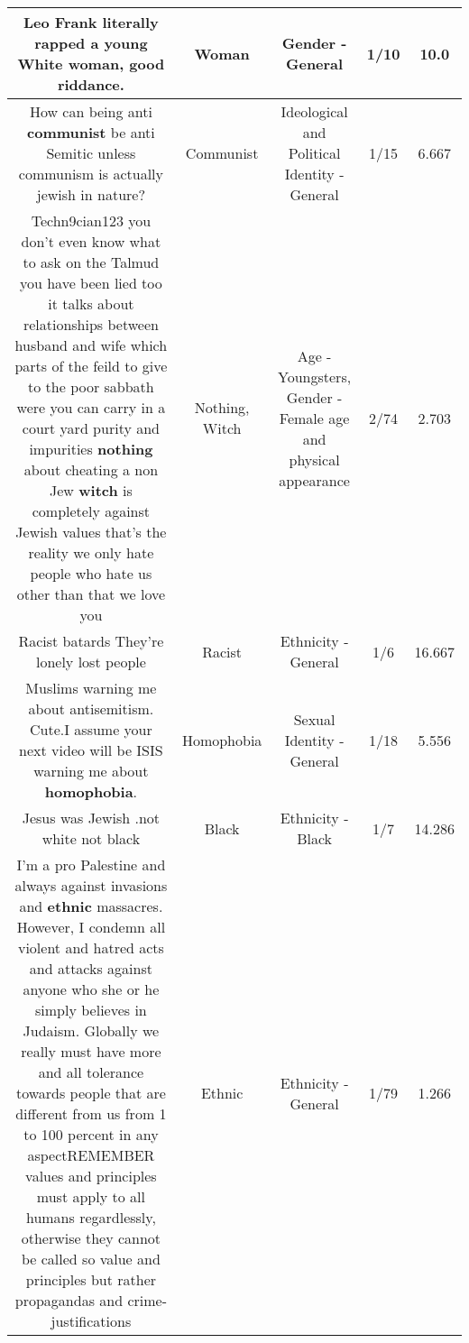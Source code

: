 \documentclass[11pt]{article}
\newlength\mylength
\begin{document}
\begin{center}
\begin{longtable}{|C{.65\mylength}|C{.30\mylength}|C{.12\mylength}|C{.12\mylength}|C{.12\mylength}|}
  \small Leo Frank literally rapped a young White \textbf{woman}, good riddance.\normalsize   & Woman & Gender - General & 1/10 & 10.0 \\  \hline
  \small How can being anti \textbf{communist} be anti Semitic unless communism is actually jewish in nature?\normalsize   & Communist &  Ideological and Political Identity - General & 1/15 & 6.667 \\  \hline
  \small Techn9cian123 you don't even know what to ask on the Talmud you have been lied too it talks about relationships between husband and wife which parts of the feild to give to the poor sabbath were you can carry in a court yard purity and impurities \textbf{nothing} about cheating a non Jew \textbf{witch} is completely against Jewish values that's the reality we only hate people who hate us other than that we love you\normalsize   & Nothing, Witch & Age - Youngsters, Gender - Female age and physical appearance & 2/74 & 2.703 \\  \hline
  \small Racist batards They're lonely lost people\normalsize   & Racist & Ethnicity - General & 1/6 & 16.667 \\  \hline
  \small Muslims warning me about antisemitism. Cute.I assume your next video will be ISIS warning me about \textbf{homophobia}.\normalsize   & Homophobia & Sexual Identity - General & 1/18 & 5.556 \\  \hline
  \small Jesus was Jewish .not white not black\normalsize   & Black & Ethnicity - Black & 1/7 & 14.286 \\  \hline
  \small I'm a pro Palestine and always against invasions and \textbf{ethnic} massacres. However, I condemn all violent and hatred acts and attacks against anyone who she or he simply believes in Judaism. Globally we really must have more and all tolerance towards people that are different from us from 1 to 100 percent in any aspectREMEMBER values and principles must apply to all humans regardlessly, otherwise they cannot be called so value and principles but rather propagandas and crime-justifications\normalsize   & Ethnic & Ethnicity - General & 1/79 & 1.266 \\  \hline

\end{longtable}
\end{center}
\end{document}
